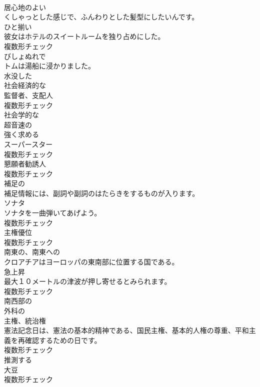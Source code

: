 \documentclass[8pt]{extreport}
\begin{document}
\begin{CJK}{UTF8}{min}
\\	[形容詞]	居心地のよい	
\\	くしゃっとした感じで、ふんわりとした髪型にしたいんです。	
\\	[名詞]	ひと揃い	
\\	彼女はホテルのスイートルームを独り占めにした。	
\\	複数形チェック
\\	[形容詞]	びしょぬれで	
\\	トムは湯船に浸かりました。	
\\	[形容詞]	水没した	
\\	[形容詞]	社会経済的な	
\\	[名詞]	監督者、支配人	
\\	複数形チェック
\\	[形容詞]	社会学的な	
\\	[形容詞]	超音速の	
\\	[動詞]	強く求める	
\\	[名詞]	スーパースター	
\\	複数形チェック
\\	[名詞]	懇願者勧誘人	
\\	複数形チェック
\\	[形容詞]	補足の	
\\	補足情報には、副詞や副詞のはたらきをするものが入ります。	
\\	[名詞]	ソナタ	
\\	ソナタを一曲弾いてあげよう。	
\\	複数形チェック
\\	[名詞]	主権優位	
\\	複数形チェック
\\	[形容詞]	南東の、南東への	
\\	クロアチアはヨーロッパの東南部に位置する国である。	
\\	[名詞]	急上昇	
\\	最大１０メートルの津波が押し寄せるとみられます。	
\\	複数形チェック
\\	[形容詞]	南⻄部の	
\\	[形容詞]	外科の	
\\	[名詞]	主権、統治権	
\\	憲法記念日は、憲法の基本的精神である、国民主権、基本的人権の尊重、平和主義を再確認するための日です。	
\\	複数形チェック
\\	[動詞]	推測する	
\\	[名詞]	大豆	
\\	複数形チェック

\end{CJK}
\end{document}
